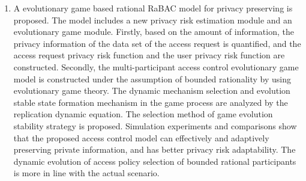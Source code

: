 \begin{englishabstract}
\begin{enumerate}
		\item 
		A evolutionary game based rational RaBAC model for privacy preserving is proposed. The model includes a new privacy risk estimation module and an evolutionary game module. Firstly, based on the amount of information, the privacy information of the data set of the access request is quantified, and the access request privacy risk function and the user privacy risk function are constructed. Secondly, the multi-participant access control evolutionary game model is constructed under the assumption of bounded rationality by using evolutionary game theory. The dynamic mechanism selection and evolution stable state formation mechanism in the game process are analyzed by the replication dynamic equation. The selection method of game evolution stability strategy is proposed. Simulation experiments and comparisons show that the proposed access control model can effectively and adaptively preserving private information, and has better privacy risk adaptability. The dynamic evolution of access policy selection of bounded rational participants is more in line with the actual scenario.
	\end{enumerate}
\end{englishabstract}